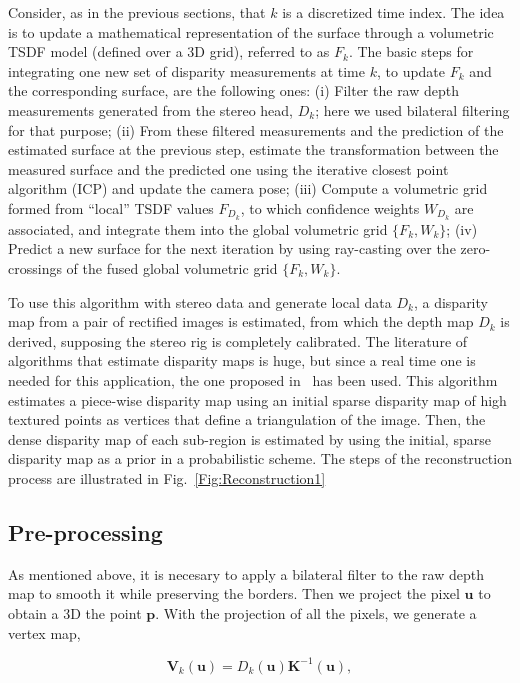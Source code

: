 Consider, as in the previous sections, that $k$ is a discretized time index. The idea is to update a mathematical representation of the surface through a volumetric TSDF model (defined over a 3D grid), referred to as $F_k$. The basic steps for integrating one new set of disparity measurements at time $k$, to update $F_k$ and the corresponding surface, are the following ones: (i) Filter the raw depth measurements generated from the stereo head, $D_k$; here we used bilateral filtering for that purpose; (ii) From these filtered measurements and the prediction of the estimated surface at the previous step, estimate the transformation between the measured surface and the predicted one using the iterative closest point algorithm (ICP) and update the camera pose; (iii) Compute a volumetric grid formed from ``local'' TSDF values $F_{D_k}$, to which confidence weights $W_{D_k}$ are associated, and integrate them into the global volumetric grid $\{F_k,W_k\}$; (iv) Predict a new surface for the next iteration by using ray-casting over the zero-crossings of the fused global volumetric grid $\{F_k,W_k\}$. 

To use this algorithm with stereo data and generate local data $D_k$, a disparity map from a pair of rectified images is estimated, from which the depth map $D_k$ is derived, supposing the stereo rig is completely calibrated. The literature of algorithms that estimate disparity maps is huge, but since a real time one is needed for this application, the one proposed in~\citep{Geiger2010} has been used. This algorithm estimates a piece-wise disparity map using an initial sparse disparity map of high textured points as vertices that define a triangulation of the image. Then, the dense disparity map of each sub-region is estimated by using the initial, sparse disparity map as a prior in a probabilistic scheme. The steps of the reconstruction process are illustrated in Fig.~\ref{Fig:Reconstruction1}

\subsection{Pre-processing}
As mentioned above, it is necesary to apply a bilateral filter to the raw depth map to smooth it while preserving the borders.
Then we project the pixel $\mathbf{u}$ to obtain a 3D the point $\mathbf{p}$. With the projection of all the pixels, we generate a vertex map,

\begin{equation}
 \mathbf{V}_k(\mathbf{u}) = D_k(\mathbf{u})\mathbf{K}^{-1}(\mathbf{u}),
\end{equation}

